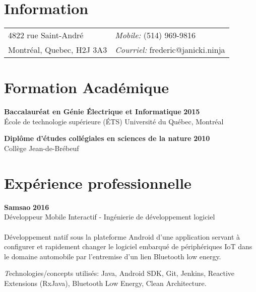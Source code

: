 \documentclass[margin,line]{res}
\begin{document}

\begin{resume}
\section{\sc Information}
\vspace{.05in}
\begin{tabular}{@{}p{2in}p{4in}}
4822 rue Saint-André& {\it Mobile:}  (514) 969-9816 \\            
Montréal, Quebec, H2J 3A3 &{\it Courriel:} frederic@janicki.ninja\\      
\end{tabular}



\section{\sc Formation Académique}
{\bf Baccalauréat en Génie Électrique et Informatique} \hfill {\bf 2015}\\
École de technologie supérieure (ÉTS)
Université du Québec, Montréal


{\bf Diplôme d'études collégiales en sciences de la nature} \hfill {\bf 2010}\\
Collège Jean-de-Brébeuf


\section{\sc Expérience professionnelle}
{\bf Samsao} \hfill {\bf 2016}\\
Développeur Mobile Interactif - Ingénierie de développement logiciel\\\\
Développement natif sous la plateforme Android d'une application servant à configurer et rapidement changer le logiciel embarqué de périphériques IoT dans le domaine automobile par l'entremise d'un lien Bluetooth low energy.

{\emph Technologies/concepts utilisés:} Java, Android SDK, Git, Jenkins, Reactive Extensions (RxJava), Bluetooth Low Energy, Clean Architecture.


\end{resume}
\end{document}
